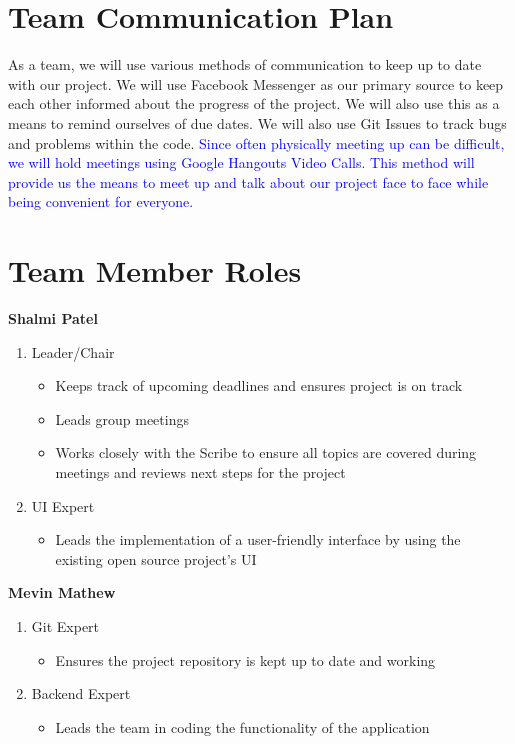 \documentclass{article}
\begin{document}
\section{Team Communication Plan}
As a team, we will use various methods of communication to keep up to date with our project. We will use Facebook Messenger as our primary source to keep each other informed about the progress of the project. We will also use this as a means to remind ourselves of due dates. We will also use Git Issues to track bugs and problems within the code. \textcolor{blue}{Since often physically meeting up can be difficult, we will hold meetings using Google Hangouts Video Calls. This method will provide us the means to meet up and talk about our project face to face while being convenient for everyone.}

\newpage

\section{Team Member Roles}
\textbf{Shalmi Patel}
\begin{enumerate}
  \item Leader/Chair
  \begin{itemize}
    \item Keeps track of upcoming deadlines and ensures project is on track
    \item Leads group meetings
    \item Works closely with the Scribe to ensure all topics are covered during meetings and reviews next steps for the project
  \end{itemize}
  \item UI Expert
  \begin{itemize}
    \item Leads the implementation of a user-friendly interface by using the existing open source project’s UI
  \end{itemize}
\end{enumerate} 

\vspace{5mm}

\textbf{Mevin Mathew}
\begin{enumerate}
  \item Git Expert
  \begin{itemize}
    \item Ensures the project repository is kept up to date and working
  \end{itemize}
  \item Backend Expert
  \begin{itemize}
    \item Leads the team in coding the functionality of the application
  \end{itemize}
\end{enumerate}
\end{document}
